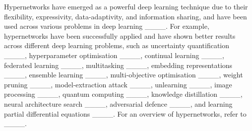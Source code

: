 Hypernetworks have emerged as a powerful deep learning technique due to their flexibility, expressivity, data-adaptivity, and information sharing, and have been used across various problems in deep learning ____. For example, hypernetworks have been successfully applied and have shown better results across different deep learning problems, such as uncertainty quantification ____, hyperparameter optimisation ____, continual learning ____, federated learning ____, multitasking ____, embedding representations ____, ensemble learning ____, multi-objective optimisation ____, weight pruning ____, model-extraction attack ____, unlearning ____, image processing ____, quantum computing ____, knowledge distillation ____, neural architecture search ____, adversarial defence ____, and learning partial differential equations ____. For an overview of hypernetworks, refer to ____.

